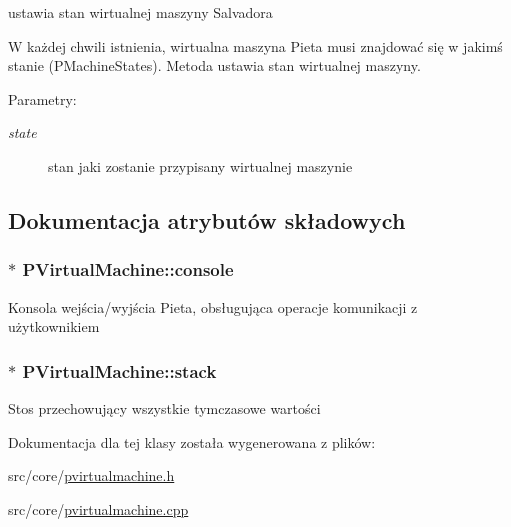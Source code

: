 ustawia stan wirtualnej maszyny Salvadora 

W każdej chwili istnienia, wirtualna maszyna Pieta musi znajdować się w jakimś stanie (PMachineStates). Metoda ustawia stan wirtualnej maszyny. \begin{Desc}
\item[Parametry:]
\begin{description}
\item[{\em state}]stan jaki zostanie przypisany wirtualnej maszynie \end{description}
\end{Desc}


\subsection{Dokumentacja atrybutów składowych}
\hypertarget{classPVirtualMachine_67feeb2d88b4c8b766d10d6f7d8eb65b}{
\subsubsection[{console}]{$\ast$ {\bf PVirtualMachine::console}}}
\label{classPVirtualMachine_67feeb2d88b4c8b766d10d6f7d8eb65b}


Konsola wejścia/wyjścia Pieta, obsługująca operacje komunikacji z użytkownikiem \hypertarget{classPVirtualMachine_fe929445de96589087a96a8f1188fac0}{
\subsubsection[{stack}]{$\ast$ {\bf PVirtualMachine::stack}}}
\label{classPVirtualMachine_fe929445de96589087a96a8f1188fac0}


Stos przechowujący wszystkie tymczasowe wartości 

Dokumentacja dla tej klasy została wygenerowana z plików:\begin{CompactItemize}
\item 
src/core/\hyperlink{pvirtualmachine_8h}{pvirtualmachine.h}\item 
src/core/\hyperlink{pvirtualmachine_8cpp}{pvirtualmachine.cpp}\end{CompactItemize}
